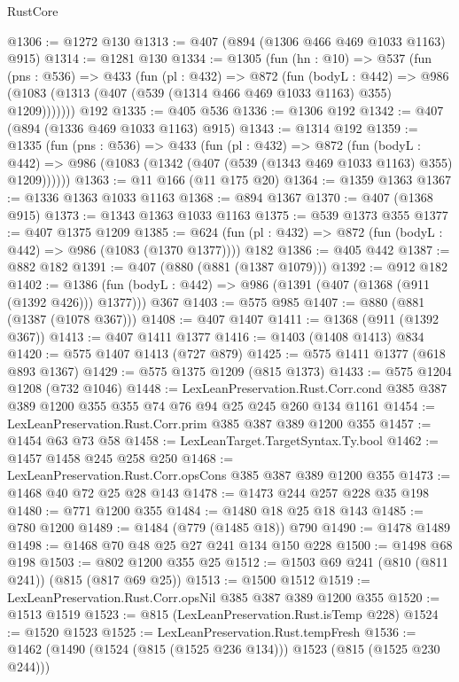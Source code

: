 \begin{lexlean}{RustCore}
\begin{coremodule}
@1306 := @1272 @130
@1313 := @407 (@894 (@1306 @466 @469 @1033 @1163) @915)
@1314 := @1281 @130
@1334 := @1305
    (fun (hn : @10) =>
    @537
      (fun (pns : @536) =>
      @433
        (fun (pl : @432) =>
        @872
          (fun (bodyL : @442) =>
          @986 (@1083 (@1313 (@407 (@539 (@1314 @466 @469 @1033 @1163) @355) @1209)))))))
    @192
@1335 := @405 @536
@1336 := @1306 @192
@1342 := @407 (@894 (@1336 @469 @1033 @1163) @915)
@1343 := @1314 @192
@1359 := @1335
    (fun (pns : @536) =>
    @433
      (fun (pl : @432) =>
      @872
        (fun (bodyL : @442) =>
        @986 (@1083 (@1342 (@407 (@539 (@1343 @469 @1033 @1163) @355) @1209))))))
@1363 := @11 @166 (@11 @175 @20)
@1364 := @1359 @1363
@1367 := @1336 @1363 @1033 @1163
@1368 := @894 @1367
@1370 := @407 (@1368 @915)
@1373 := @1343 @1363 @1033 @1163
@1375 := @539 @1373 @355
@1377 := @407 @1375 @1209
@1385 := @624 (fun (pl : @432) => @872 (fun (bodyL : @442) => @986 (@1083 (@1370 @1377)))) @182
@1386 := @405 @442
@1387 := @882 @182
@1391 := @407 (@880 (@881 (@1387 @1079)))
@1392 := @912 @182
@1402 := @1386 (fun (bodyL : @442) => @986 (@1391 (@407 (@1368 (@911 (@1392 @426))) @1377))) @367
@1403 := @575 @985
@1407 := @880 (@881 (@1387 (@1078 @367)))
@1408 := @407 @1407
@1411 := @1368 (@911 (@1392 @367))
@1413 := @407 @1411 @1377
@1416 := @1403 (@1408 @1413) @834
@1420 := @575 @1407 @1413 (@727 @879)
@1425 := @575 @1411 @1377 (@618 @893 @1367)
@1429 := @575 @1375 @1209 (@815 @1373)
@1433 := @575 @1204 @1208 (@732 @1046)
@1448 := LexLeanPreservation.Rust.Corr.cond
    @385
    @387
    @389
    @1200
    @355
    @355
    @74
    @76
    @94
    @25
    @245
    @260
    @134
    @1161
@1454 := LexLeanPreservation.Rust.Corr.prim @385 @387 @389 @1200 @355
@1457 := @1454 @63 @73 @58
@1458 := LexLeanTarget.TargetSyntax.Ty.bool
@1462 := @1457 @1458 @245 @258 @250
@1468 := LexLeanPreservation.Rust.Corr.opsCons @385 @387 @389 @1200 @355
@1473 := @1468 @40 @72 @25 @28 @143
@1478 := @1473 @244 @257 @228 @35 @198
@1480 := @771 @1200 @355
@1484 := @1480 @18 @25 @18 @143
@1485 := @780 @1200
@1489 := @1484 (@779 (@1485 @18)) @790
@1490 := @1478 @1489
@1498 := @1468 @70 @48 @25 @27 @241 @134 @150 @228
@1500 := @1498 @68 @198
@1503 := @802 @1200 @355 @25
@1512 := @1503 @69 @241 (@810 (@811 @241)) (@815 (@817 @69 @25))
@1513 := @1500 @1512
@1519 := LexLeanPreservation.Rust.Corr.opsNil @385 @387 @389 @1200 @355
@1520 := @1513 @1519
@1523 := @815 (LexLeanPreservation.Rust.isTemp @228)
@1524 := @1520 @1523
@1525 := LexLeanPreservation.Rust.tempFresh
@1536 := @1462 (@1490 (@1524 (@815 (@1525 @236 @134))) @1523 (@815 (@1525 @230 @244)))

\end{coremodule}
\end{lexlean}
